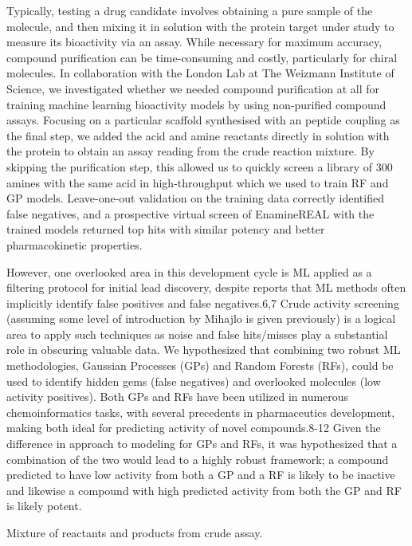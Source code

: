 Typically, testing a drug candidate involves obtaining a pure sample of the molecule, and then mixing it in solution with the protein target under study to measure its bioactivity via an assay. While necessary for maximum accuracy, compound purification can be time-consuming and costly, particularly for chiral molecules. In collaboration with the London Lab at The Weizmann Institute of Science, we investigated whether we needed compound purification at all for training machine learning bioactivity models by using non-purified compound assays. Focusing on a particular scaffold synthesised with an peptide coupling as the final step, we added the acid and amine reactants directly in solution with the protein to obtain an assay reading from the crude reaction mixture. By skipping the purification step, this allowed us to quickly screen a library of 300 amines with the same acid in high-throughput which we used to train RF and GP models. Leave-one-out validation on the training data correctly identified false negatives, and a prospective virtual screen of EnamineREAL with the trained models returned top hits with similar potency and better pharmacokinetic properties.

However, one overlooked area in this development cycle is ML applied as a filtering protocol for initial lead discovery, despite reports that ML methods often implicitly identify false positives and false negatives.6,7 Crude activity screening (assuming some level of introduction by Mihajlo is given previously) is a logical area to apply such techniques as noise and false hits/misses play a substantial role in obscuring valuable data. We hypothesized that combining two robust ML methodologies, Gaussian Processes (GPs) and Random Forests (RFs), could be used to identify hidden gems (false negatives) and overlooked molecules (low activity positives). Both GPs and RFs have been utilized in numerous chemoinformatics tasks, with several precedents in pharmaceutics development, making both ideal for predicting activity of novel compounds.8-12 Given the difference in approach to modeling for GPs and RFs, it was hypothesized that a combination of the two would lead to a highly robust framework; a compound predicted to have low activity from both a GP and a RF is likely to be inactive and likewise a compound with high predicted activity from both the GP and RF is likely potent.

Mixture of reactants and products from crude assay.

